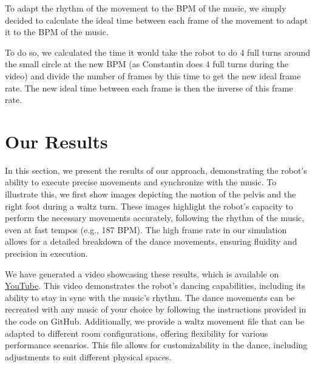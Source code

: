 \documentclass{amsart}
\theoremstyle{definition}
\theoremstyle{plain}
\begin{document}
To adapt the rhythm of the movement to the BPM of the music, we simply decided to calculate the ideal time between each frame of the movement to adapt it to the BPM of the music. 

To do so, we calculated the time it would take the robot to do 4 full turns around the small circle at the new BPM (as Constantin does 4 full turns during the video) 
and divide the number of frames by this time to get the new ideal frame rate. 
The new ideal time between each frame is then the inverse of this frame rate.

\section{Our Results}

In this section, we present the results of our approach, demonstrating the robot's ability to execute precise movements and synchronize with the music. 
To illustrate this, we first show images depicting the motion of the pelvis and the right foot during a waltz turn. These images highlight the robot's capacity to perform the necessary movements accurately, 
following the rhythm of the music, even at fast tempos (e.g., 187 BPM). 
The high frame rate in our simulation allows for a detailed breakdown of the dance movements, ensuring fluidity and precision in execution.

We have generated a video showcasing these results, which is available on \href{https://www.youtube.com/watch?v=1MIFP3BURI0}{YouTube}. 
This video demonstrates the robot’s dancing capabilities, including its ability to stay in sync with the music’s rhythm. 
The dance movements can be recreated with any music of your choice by following the instructions provided in the code on GitHub. 
Additionally, we provide a waltz movement file that can be adapted to different room configurations, offering flexibility for various performance scenarios. 
This file allows for customizability in the dance, including adjustments to suit different physical spaces.
\end{document}
